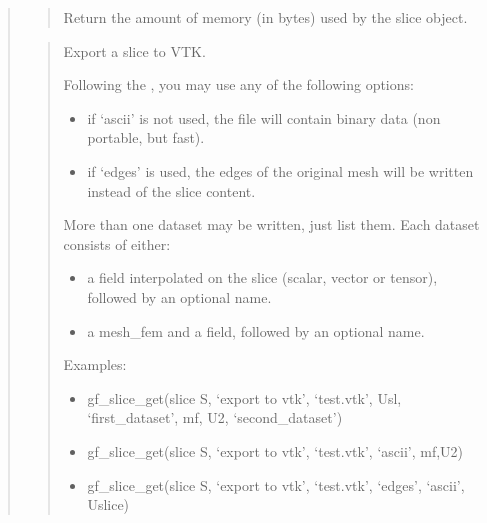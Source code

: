 \documentclass[a4paper,11pt,english]{sphinxmanual}
\begin{document}
\begin{quote}
\begin{quote}

Return the amount of memory (in bytes) used by the slice object.
\end{quote}

\begin{quote}

Export a slice to VTK.

Following the , you may use any of the following options:
\begin{itemize}
\item {} 
if ‘ascii’ is not used, the file will contain binary data
(non portable, but fast).

\item {} 
if ‘edges’ is used, the edges of the original mesh will be
written instead of the slice content.

\end{itemize}

More than one dataset may be written, just list them. Each dataset
consists of either:
\begin{itemize}
\item {} 
a field interpolated on the slice (scalar, vector or tensor),
followed by an optional name.

\item {} 
a mesh\_fem and a field, followed by an optional name.

\end{itemize}

Examples:
\begin{itemize}
\item {} 
gf\_slice\_get(slice S, ‘export to vtk’, ‘test.vtk’, Usl, ‘first\_dataset’, mf,
U2, ‘second\_dataset’)

\item {} 
gf\_slice\_get(slice S, ‘export to vtk’, ‘test.vtk’, ‘ascii’, mf,U2)

\item {} 
gf\_slice\_get(slice S, ‘export to vtk’, ‘test.vtk’, ‘edges’, ‘ascii’, Uslice)

\end{itemize}
\end{quote}

\begin{quote}


\end{quote}
\end{quote}
\end{document}
